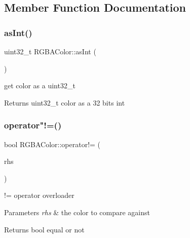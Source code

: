 \subsection{Member Function Documentation}
\mbox{\label{struct_r_g_b_a_color_a9bbae2e2f28e388d589b83ab25f94b6a}} 
\subsubsection{\texorpdfstring{as\+Int()}{asInt()}}
{\footnotesize\ttfamily uint32\+\_\+t R\+G\+B\+A\+Color\+::as\+Int (\begin{DoxyParamCaption}{ }\end{DoxyParamCaption})\hspace{0.3cm}{\ttfamily [inline]}}



get color as a uint32\+\_\+t 

\begin{DoxyReturn}{Returns}
uint32\+\_\+t color as a 32 bits int 
\end{DoxyReturn}
\mbox{\label{struct_r_g_b_a_color_a5e327a23436aa072a58003f0033729b1}} 
\subsubsection{\texorpdfstring{operator"!=()}{operator!=()}}
{\footnotesize\ttfamily bool R\+G\+B\+A\+Color\+::operator!= (\begin{DoxyParamCaption}\item[{const \hyperlink{struct_r_g_b_a_color}{R\+G\+B\+A\+Color} \&}]{rhs }\end{DoxyParamCaption})\hspace{0.3cm}{\ttfamily [inline]}}



!= operator overloader 


\begin{DoxyParams}{Parameters}
{\em rhs} & the color to compare against \\
\hline
\end{DoxyParams}
\begin{DoxyReturn}{Returns}
bool equal or not 
\end{DoxyReturn}
\mbox{\label{struct_r_g_b_a_color_a8bad14391669eefbba155db49757b5c6}} 
